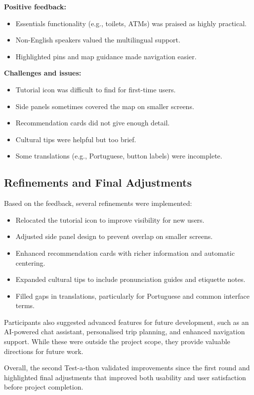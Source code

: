 \textbf{Positive feedback:}
\begin{itemize}
    \item Essentials functionality (e.g., toilets, ATMs) was praised as highly practical.
    \item Non-English speakers valued the multilingual support.
    \item Highlighted pins and map guidance made navigation easier.
\end{itemize}

\textbf{Challenges and issues:}
\begin{itemize}
    \item Tutorial icon was difficult to find for first-time users.
    \item Side panels sometimes covered the map on smaller screens.
    \item Recommendation cards did not give enough detail.
    \item Cultural tips were helpful but too brief.
    \item Some translations (e.g., Portuguese, button labels) were incomplete.
\end{itemize}

\subsection{Refinements and Final Adjustments}
Based on the feedback, several refinements were implemented:
\begin{itemize}
    \item Relocated the tutorial icon to improve visibility for new users.
    \item Adjusted side panel design to prevent overlap on smaller screens.
    \item Enhanced recommendation cards with richer information and automatic centering.
    \item Expanded cultural tips to include pronunciation guides and etiquette notes.
    \item Filled gaps in translations, particularly for Portuguese and common interface terms.
\end{itemize}

Participants also suggested advanced features for future development, such as an AI-powered chat assistant, personalised trip planning, and enhanced navigation support. While these were outside the project scope, they provide valuable directions for future work.

Overall, the second Test-a-thon validated improvements since the first round and highlighted final adjustments that improved both usability and user satisfaction before project completion.


